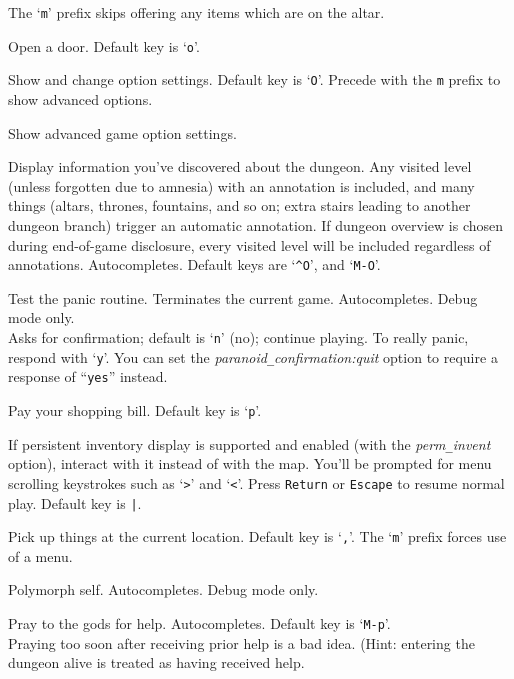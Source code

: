 The `{\tt m}' prefix skips offering any items which are on the altar.\\
\item[\tb{\#open}]
Open a door. Default key is `{\tt o}'.
\item[\tb{\#options}]
Show and change option settings. Default key is `{\tt O}'.
Precede with the {\tt m} prefix to show advanced options.
\item[\tb{\#optionsfull}]
Show advanced game option settings.
\item[\tb{\#overview}]
Display information you've discovered about the dungeon.  Any visited
level (unless forgotten due to amnesia) with an annotation is included,
and many things (altars, thrones, fountains, and so on; extra stairs
leading to another dungeon branch) trigger an automatic annotation.
If dungeon overview is chosen during end-of-game disclosure, every visited
level will be included regardless of annotations. Autocompletes.
Default keys are `{\tt \^{}O}', and `{\tt M-O}'.
\item[\tb{\#panic}]
Test the panic routine.
Terminates the current game.
Autocompletes.
Debug mode only.\\
Asks for confirmation; default is `{\tt n}' (no); continue playing.
To really panic, respond with `{\tt y}'.
You can set the
{\it paranoid\verb+_+confirmation:quit\/}
option to require a response of ``{\tt yes}'' instead.
\item[\tb{\#pay}]
Pay your shopping bill. Default key is `{\tt p}'.
\item[\tb{\#perminv}]
If persistent inventory display is supported and enabled (with the
{\it perm\verb+_+invent\/} option), interact with it instead of with the map.
You'll be prompted for menu scrolling keystrokes such
as `{\tt \verb+>+}' and `{\tt \verb+<+}'.
Press {\tt Return} or {\tt Escape} to resume normal play.
Default key is {\tt \verb+|+}.
\item[\tb{\#pickup}]
Pick up things at the current location. Default key is `{\tt ,}'.
The `{\tt m}' prefix forces use of a menu.
\item[\tb{\#polyself}]
Polymorph self.
Autocompletes.
Debug mode only.
\item[\tb{\#pray}]
Pray to the gods for help. Autocompletes. Default key is `{\tt M-p}'.\\
Praying too soon after receiving prior help is a bad idea.
(Hint: entering the dungeon alive is treated as having received help.
